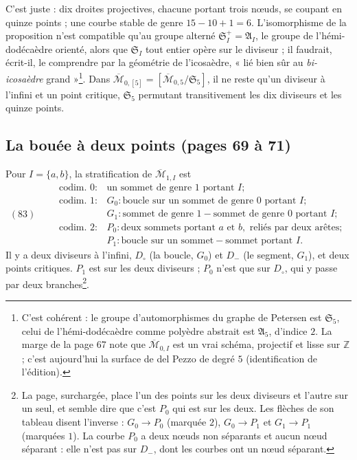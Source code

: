\documentclass[11pt,a4paper]{article}
\begin{document}
C'est juste : dix droites projectives, chacune portant trois nœuds, se coupant
en quinze points ; une courbe stable de genre $15 - 10 + 1 = 6$. L'isomorphisme
de la proposition n'est compatible qu'au groupe alterné $\mathfrak{S}_I^{+} =
\mathfrak{A}_I$, le groupe de l'hémi-dodécaèdre orienté, alors que
$\mathfrak{S}_I$ tout entier opère sur le diviseur ; il faudrait, écrit-il, le
comprendre par la géométrie de l'icosaèdre, « lié bien sûr au \emph{bi-icosaèdre}
grand »\footnote{C'est cohérent : le groupe d'automorphismes du graphe de
Petersen est $\mathfrak{S}_5$, celui de l'hémi-dodécaèdre comme polyèdre abstrait
est $\mathfrak{A}_5$, d'indice $2$. La marge de la page 67 note que
$\overline{\mathcal{M}}_{0,I}$ est un vrai schéma, projectif et lisse sur
$\mathbb{Z}$ ; c'est aujourd'hui la surface de del Pezzo de degré $5$
(identification de l'édition).}. Dans $\overline{\mathcal{M}}_{0,[5]} =
[\overline{\mathcal{M}}_{0,5}/\mathfrak{S}_5]$, il ne reste qu'un diviseur à
l'infini et un point critique, $\mathfrak{S}_5$ permutant transitivement les dix
diviseurs et les quinze points.

\subsection*{La bouée à deux points (pages 69 à 71)}

Pour $I = \{a, b\}$, la stratification de $\overline{\mathcal{M}}_{1,I}$ est
\[
(83) \qquad
\begin{array}{ll}
\text{codim. } 0 : & \text{un sommet de genre } 1 \text{ portant } I ; \\
\text{codim. } 1 : & G_0 : \text{boucle sur un sommet de genre } 0
\text{ portant } I ; \\
& G_1 : \text{sommet de genre } 1 - \text{sommet de genre } 0 \text{ portant } I ; \\
\text{codim. } 2 : & P_0 : \text{deux sommets portant } a \text{ et } b,
\text{ reliés par deux arêtes} ; \\
& P_1 : \text{boucle sur un sommet} - \text{sommet portant } I .
\end{array}
\]
Il y a deux diviseurs à l'infini, $D_\circ$ (la boucle, $G_0$) et $D_-$ (le segment,
$G_1$), et deux points critiques. $P_1$ est sur les deux diviseurs ; $P_0$ n'est
que sur $D_\circ$, qui y passe par deux branches\footnote{La page, surchargée,
place l'un des points sur les deux diviseurs et l'autre sur un seul, et semble
dire que c'est $P_0$ qui est sur les deux. Les flèches de son tableau disent
l'inverse : $G_0 \to P_0$ (marquée $2$), $G_0 \to P_1$ et $G_1 \to P_1$ (marquées
$1$). La courbe $P_0$ a deux nœuds non séparants et aucun nœud séparant : elle
n'est pas sur $D_-$, dont les courbes ont un nœud séparant.}.
\end{document}
